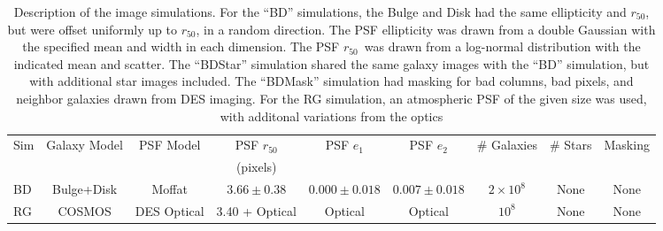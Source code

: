 \documentclass[usegraphicx,usenatbib]{mn2e}
\newcommand{\hlr}{$r_{50}$}
\newcommand{\nsimNgal}{$10^8$}
\newcommand{\nsimNgaltwo}{$2 \times 10^8$}
\newcommand{\nsimNstar}{$10^7$}
\newcommand{\psfeonedist}{$0.000  \pm 0.018$}
\newcommand{\psfetwodist}{$0.007 \pm 0.018$}
\newcommand{\psfrdist}{$3.66 \pm 0.38$}
\begin{document}
\begin{table}
    \centering
    \caption{Description of the image simulations.  For the ``BD'' simulations,
        the Bulge and Disk had the same ellipticity and \hlr, but were offset
        uniformly up to \hlr, in a random direction.  The PSF ellipticity was
        drawn from a double Gaussian with the specified mean and width in each
        dimension.  The PSF \hlr\ was drawn from a log-normal distribution with
        the indicated mean and scatter.  The ``BDStar'' simulation shared the
        same galaxy images with the ``BD'' simulation, but with additional star
        images included.  The ``BDMask'' simulation had masking for bad columns,
        bad pixels, and neighbor galaxies drawn from DES imaging. For the RG
        simulation, an atmospheric PSF of the given size was used,
        with additonal variations from the optics \label{tab:sims}}
    \begin{tabular}{ | l | c | c | c | c | c | c | c | c |}
        Sim          & Galaxy Model & PSF Model & PSF \hlr & PSF $e_1$      & PSF $e_2$           & \# Galaxies & \# Stars    & Masking   \\
                     &              &           & (pixels)  &                &                     &             &             &  \\
        \hline
        BD           & Bulge+Disk   & Moffat    & \psfrdist & \psfeonedist  &\psfetwodist   &  \nsimNgaltwo   & None        & None      \\
        RG           & COSMOS      & DES Optical & 3.40 + Optical  & Optical  & Optical  &  \nsimNgal   & None        & None      \\
    \end{tabular}
\end{table}
\end{document}

